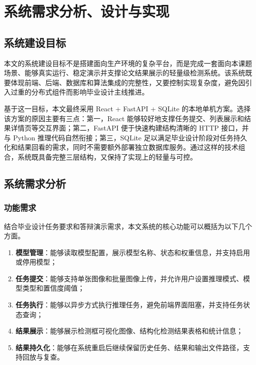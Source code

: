 
\chapter{系统需求分析、设计与实现}
\label{ch:system}

\section{系统建设目标}

本文的系统建设目标不是搭建面向生产环境的复杂平台，而是完成一套面向本课题场景、能够真实运行、稳定演示并支撑论文结果展示的轻量级检测系统。该系统既要体现前端、后端、数据库和算法集成的完整性，又要控制实现复杂度，避免因引入过重的分布式组件而影响毕业设计主线推进。

基于这一目标，本文最终采用 React + FastAPI + SQLite 的本地单机方案。选择该方案的原因主要有三点：第一，React 能够较好地支撑任务提交、列表展示和结果详情页等交互界面；第二，FastAPI 便于快速构建结构清晰的 HTTP 接口，并与 Python 推理代码自然衔接；第三，SQLite 足以满足毕业设计阶段对任务持久化和结果回看的需求，同时不需要额外部署独立数据库服务。通过这样的技术组合，系统既具备完整三层结构，又保持了实现上的轻量与可控。

\section{系统需求分析}

\subsection{功能需求}

结合毕业设计任务要求和答辩演示需求，本文系统的核心功能可以概括为以下几个方面。

\begin{enumerate}
  \item \textbf{模型管理}：能够读取模型配置，展示模型名称、状态和权重信息，并支持启用或停用模型；
  \item \textbf{任务提交}：能够支持单张图像和批量图像上传，并允许用户设置推理模式、模型类型和置信度阈值；
  \item \textbf{任务执行}：能够以异步方式执行推理任务，避免前端界面阻塞，并支持任务状态查询；
  \item \textbf{结果展示}：能够展示检测框可视化图像、结构化检测结果表格和统计信息；
  \item \textbf{结果持久化}：能够在系统重启后继续保留历史任务、结果和输出文件路径，支持回放与复查。
\end{enumerate}


